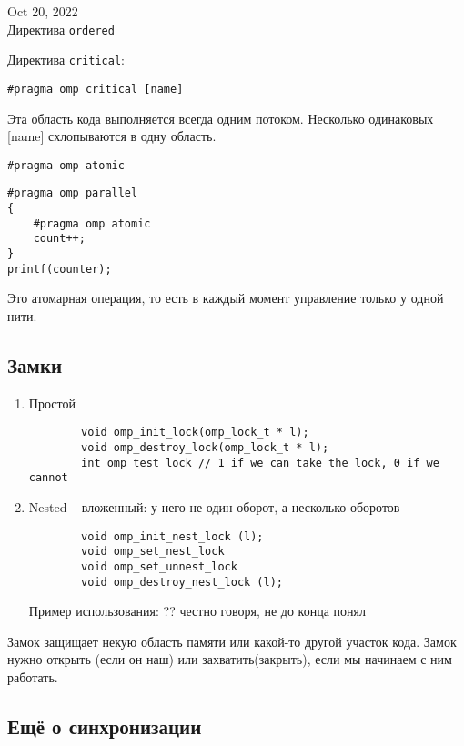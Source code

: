 \documentclass[main.tex]{subfiles}
\begin{document}
Oct 20, 2022 \\

Директива \texttt{ordered}

Директива \texttt{critical}: 

\begin{verbatim}
#pragma omp critical [name]
\end{verbatim}

Эта область кода выполняется всегда одним потоком.
Несколько одинаковых [name] схлопываются в одну область.

\begin{verbatim}
#pragma omp atomic
\end{verbatim}

\begin{verbatim}
#pragma omp parallel
{
	#pragma omp atomic
	count++;
}
printf(counter);
\end{verbatim}

Это атомарная операция, то есть в каждый момент управление только у одной нити.

\subsection{Замки}

\begin{enumerate}[noitemsep]
	\item Простой
	
	\begin{verbatim}
		void omp_init_lock(omp_lock_t * l);
		void omp_destroy_lock(omp_lock_t * l);
		int omp_test_lock // 1 if we can take the lock, 0 if we cannot
	\end{verbatim}
	
	\item Nested -- вложенный: у него не один оборот, а несколько оборотов
	
	\begin{verbatim}
		void omp_init_nest_lock (l);
		void omp_set_nest_lock
		void omp_set_unnest_lock
		void omp_destroy_nest_lock (l);
	\end{verbatim}

	Пример использования: ?? честно говоря, не до конца понял
	
\end{enumerate}

Замок защищает некую область памяти или какой-то другой участок кода.
Замок нужно открыть (если он наш) или захватить(закрыть), если мы начинаем с ним работать.

\subsection{Ещё о синхронизации}
\end{document}
